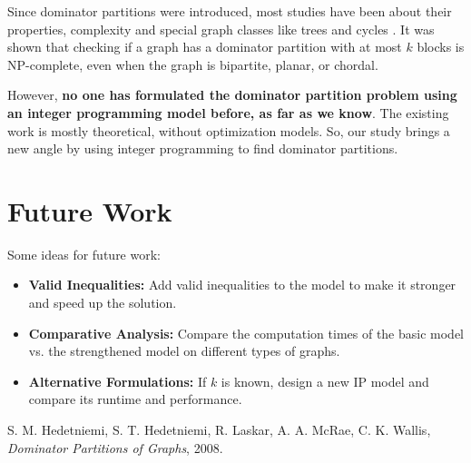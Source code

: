 \documentclass[12pt]{article}
\begin{document}
Since dominator partitions were introduced, most studies have been about their properties, complexity and special graph classes like trees and cycles \cite{dominator_partitions}. It was shown that checking if a graph has a dominator partition with at most $k$ blocks is NP-complete, even when the graph is bipartite, planar, or chordal.

However, \textbf{no one has formulated the dominator partition problem using an integer programming model before, as far as we know}. The existing work is mostly theoretical, without optimization models. So, our study brings a new angle by using integer programming to find dominator partitions.





\section{Future Work}

Some ideas for future work:
\begin{itemize}[label=--]
    \item \textbf{Valid Inequalities:} Add valid inequalities to the model to make it stronger and speed up the solution.
    \item \textbf{Comparative Analysis:} Compare the computation times of the basic model vs. the strengthened model on different types of graphs.
    \item \textbf{Alternative Formulations:} If $k$ is known, design a new IP model and compare its runtime and performance.

\end{itemize}


\begin{thebibliography}{9}

S. M. Hedetniemi, S. T. Hedetniemi, R. Laskar, A. A. McRae, C. K. Wallis,
\textit{Dominator Partitions of Graphs}, 2008.

\end{thebibliography}
\end{document}
